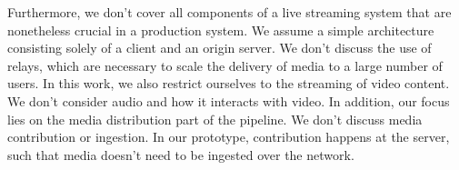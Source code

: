Furthermore, we don't cover all components of a live streaming system that are nonetheless crucial in a production system. We assume a simple architecture consisting solely of a client and an origin server. We don't discuss the use of relays, which are necessary to scale the delivery of media to a large number of users. In this work, we also restrict ourselves to the streaming of video content. We don't consider audio and how it interacts with video. In addition, our focus lies on the media distribution part of the pipeline. We don't discuss media contribution or ingestion. In our prototype, contribution happens at the server, such that media doesn't need to be ingested over the network.